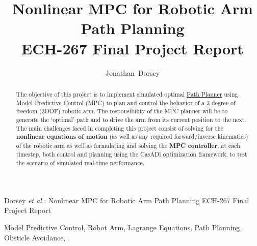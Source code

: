 \documentclass[journal]{IEEEtran}
\begin{document}
%
\title{Nonlinear MPC for Robotic Arm Path Planning \\ ECH-267 Final Project Report}


\author{Jonathan~Dorsey}



%
{Dorsey \MakeLowercase{\textit{et al.}}: Nonlinear MPC for Robotic Arm Path Planning ECH-267 Final Project Report}

\maketitle

\begin{abstract}
  The objective of this project is to implement simulated optimal \underline{Path Planner} using Model Predictive Control (MPC) to plan and control the behavior of a 3 degree of freedom (3DOF) robotic arm. The responsibility of the MPC planner will be to generate the `optimal' path and to drive the arm from its current position to the next. The main challenges faced in completing this project consist of solving for the \textbf{nonlinear equations of motion} (as well as any required forward/inverse kinematics) of the robotic arm as well as formulating and solving the \textbf{MPC controller}, at each timestep, both control and planning using the CasADi optimization framework, to test the scenario of simulated real-time performance.
\end{abstract}

\begin{IEEEkeywords}
Model Predictive Control, Robot Arm, Lagrange Equations, Path Planning, Obsticle Avoidance, .
\end{IEEEkeywords}






%
\IEEEpeerreviewmaketitle
\end{document}
